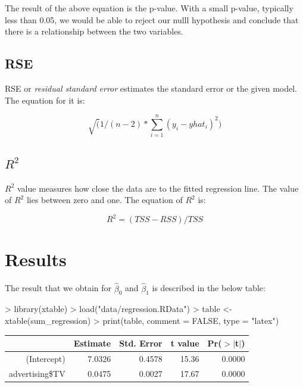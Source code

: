 \documentclass{article}
\begin{document}
The result of the above equation is the p-value. With a small p-value, typically less than 0.05, we would be able to reject our nulll hypothesis and conclude that there is a relationship between the two variables.

\subsection{RSE}

RSE or \emph{residual standard error} estimates the standard error or the given model. The equation for it is:

\begin{equation}
\sqrt( 1/ (n-2) * \sum_{i=1}^n (y_i - yhat_i)^2)
\end{equation}

\subsection{$R^2$}

$R^2$ value measures how close the data are to the fitted regression line. The value of $R^2$ lies between zero and one. The equation of $R^2$ is:

\begin{equation}
R^2 = (TSS - RSS) / TSS
\end{equation}

\section{Results}

The result that we obtain for $\hat{\beta}_0$ and $\hat{\beta}_1$ is described in the below table:

\begin{Schunk}
\begin{Sinput}
> library(xtable)
> load("data/regression.RData")
> table <- xtable(sum_regression)
> print(table, comment = FALSE, type = "latex")
\end{Sinput}
\begin{table}[ht]
\centering
\begin{tabular}{rrrrr}
  \hline
 & Estimate & Std. Error & t value & Pr($>$$|$t$|$) \\ 
  \hline
(Intercept) & 7.0326 & 0.4578 & 15.36 & 0.0000 \\ 
  advertising\$TV & 0.0475 & 0.0027 & 17.67 & 0.0000 \\ 
   \hline
\end{tabular}
\end{table}\end{Schunk}
\end{document}
